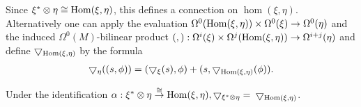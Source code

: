 Since $\xi^* \otimes  \eta  \cong  \operatorname{Hom}( \xi, \eta)$, this defines a connection on $\hom( \xi, \eta)$. 
Alternatively one can apply the evaluation $\Omega^0( {\operatorname{Hom}( \xi, \eta) })  \times  \Omega^0(\xi)  \rightarrow  \Omega^0( \eta )$ 
and the induced $\Omega^0(M)$-bilinear product $(,) :\Omega^{i}(\xi)  \times  \Omega^{j}( {\operatorname{Hom}( \xi, \eta) }) \rightarrow \Omega^{i + j}( \eta )$ 
and define $\bigtriangledown_{\operatorname{Hom}( \xi, \eta) }$ by the formula
\begin{align}\label{eq:17-16}
  \bigtriangledown_{\eta }( ( {s,\phi }) )  = ( {\bigtriangledown_{\xi }(s),\phi })  + ( {s,\bigtriangledown_{\operatorname{Hom}( \xi, \eta) }( \phi ) }).
\end{align}

\begin{lemma}\label{lemma:17-11}
  Under the identification $\alpha:\xi^* \otimes  \eta \overset{ \cong  }{ \rightarrow  }\operatorname{Hom}( \xi, \eta),
  \bigtriangledown_{\xi^* \otimes  \eta } =$  $\bigtriangledown_{\operatorname{Hom}( \xi, \eta)}$.
\end{lemma}

